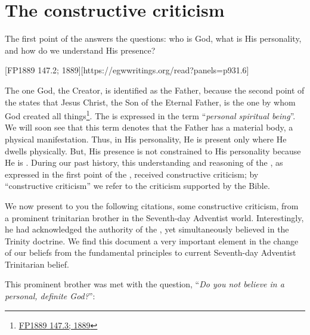 \chapter{The constructive criticism}

The first point of the  answers the questions: who is God, what is His personality, and how do we understand His presence?

[FP1889 147.2; 1889][https://egwwritings.org/read?panels=p931.6]

The one God, the Creator, is identified as the Father, because the second point of the  states that Jesus Christ, the Son of the Eternal Father, is the one by whom God created all things\footnote{\href{https://egwwritings.org/?ref=en_FP1889.147.3&para=931.7}{FP1889 147.3; 1889}}. The  is expressed in the term “\textit{personal spiritual being}”. We will soon see that this term denotes that the Father has a material body, a physical manifestation. Thus, in His personality, He is present only where He dwells physically. But, His presence is not constrained to His personality because He is . During our past history, this understanding and reasoning of the , as expressed in the first point of the , received constructive criticism; by “constructive criticism” we refer to the criticism supported by the Bible. 

We now present to you the following citations, some constructive criticism, from a prominent trinitarian brother in the Seventh-day Adventist world. Interestingly, he had acknowledged the authority of the , yet simultaneously believed in the Trinity doctrine. We find this document a very important element in the change of our beliefs from the fundamental principles to current Seventh-day Adventist Trinitarian belief.

This prominent brother was met with the question, “\textit{Do you not believe in a personal, definite God?}”:


